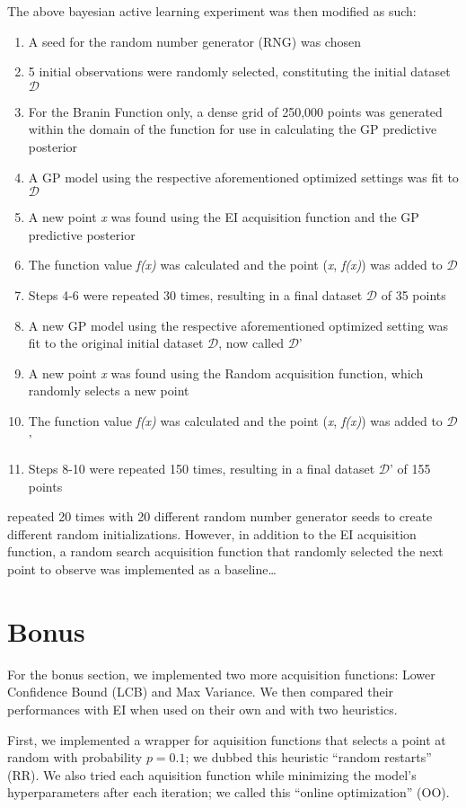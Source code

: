 \documentclass[11pt]{article}
\numberwithin{equation}{section}
\begin{document}
The above bayesian active learning experiment was then modified as such:
\begin{enumerate}
  \item A seed for the random number generator (RNG) was chosen
  \item 5 initial observations were randomly selected, constituting the initial dataset $\mathcal{D}$
  \item For the Branin Function only, a dense grid of 250,000 points was generated within the domain of the function for use in calculating the GP predictive posterior
  \item A GP model using the respective aforementioned optimized settings was fit to $\mathcal{D}$
  \item A new point \emph{x} was found using the EI acquisition function and the GP predictive posterior
  \item The function value \emph{f(x)} was calculated and the point (\emph{x}, \emph{f(x)}) was added to $\mathcal{D}$
  \item Steps 4-6 were repeated 30 times, resulting in a final dataset $\mathcal{D}$ of 35 points
  \item A new GP model using the respective aforementioned optimized setting was fit to the original initial dataset $\mathcal{D}$, now called $\mathcal{D}$'
  \item A new point \emph{x} was found using the Random acquisition function, which randomly selects a new point
  \item The function value \emph{f(x)} was calculated and the point (\emph{x}, \emph{f(x)}) was added to $\mathcal{D}$'
  \item Steps 8-10 were repeated 150 times, resulting in a final dataset $\mathcal{D}$' of 155 points
\end{enumerate}


repeated 20 times with 20 different random number generator seeds to create different random initializations. 
However, in addition to the EI acquisition function, a random search acquisition function that randomly selected the next point to observe was implemented as a baseline\dots


\section*{Bonus}
For the bonus section, we implemented two more acquisition functions: Lower
Confidence Bound (LCB) and Max Variance. We then compared their performances
with EI when used on their own and with two heuristics.

First, we implemented a wrapper for aquisition functions that selects a point
at random with probability $p = 0.1$; we dubbed this heuristic ``random
restarts'' (RR). We also tried each aquisition function while minimizing the
model's hyperparameters after each iteration; we called this ``online
optimization'' (OO). 
\end{document}
